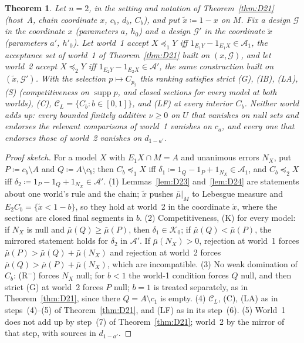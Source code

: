 \documentclass[11pt]{article}
\newtheorem{theorem}{Theorem}[section]
\theoremstyle{definition}
\theoremstyle{remark}
\newcommand{\C}{\mathcal C}
\newcommand{\supp}{\operatorname{supp}}
\begin{document}
\begin{theorem}\label{thm:H24}
Let $n=2$, in the setting and notation of Theorem~\ref{thm:D21} (host~A, chain coordinate $x$, $c_b$, $d_b$, $C_b$), and put $\tilde x\coloneqq1-x$ on $M$. Fix a design $\mathcal G$ in the coordinate $x$ (parameters $a$, $h_0$) and a design $\mathcal G'$ in the coordinate $\tilde x$ (parameters $a'$, $h'_0$). Let world~1 accept $X\preceq_1Y$ iff $1_{E_1Y}-1_{E_1X}\in\mathcal A_1$, the acceptance set of world~1 of Theorem~\ref{thm:D21} built on $(x,\mathcal G)$, and let world~2 accept $X\preceq_2Y$ iff $1_{E_2Y}-1_{E_2X}\in\mathcal A'$, the same construction built on $(\tilde x,\mathcal G')$. With the selection $p\mapsto C_{p_2}$ this ranking satisfies strict (G), (IB), (LA), (S) (competitiveness on $\supp p$, and closed sections for every model at both worlds), (C), $\C_L=\{C_b:b\in[0,1]\}$, and (LF) at every interior $C_b$. Neither world adds up: every bounded finitely additive $\nu\ge0$ on $U$ that vanishes on null sets and endorses the relevant comparisons of world~1 vanishes on $c_a$, and every one that endorses those of world~2 vanishes on $d_{1-a'}$.
\end{theorem}
\begin{proof}[Proof sketch]
For a model $X$ with $E_1X\cap M=A$ and unanimous errors $N_X$, put $P\coloneqq c_b\setminus A$ and $Q\coloneqq A\setminus c_b$; then $C_b\preceq_1X$ iff $\delta_1\coloneqq1_Q-1_P+1_{N_X}\in\mathcal A_1$, and $C_b\preceq_2X$ iff $\delta_2\coloneqq1_P-1_Q+1_{N_X}\in\mathcal A'$. (1) Lemmas~\ref{lem:D23} and~\ref{lem:D24} are statements about one world's rule and the chain; $\tilde x$ pushes $\bar\mu|_M$ to Lebesgue measure and $E_2C_b=\{\tilde x<1-b\}$, so they hold at world~2 in the coordinate $\tilde x$, where the sections are closed final segments in $b$. (2) Competitiveness, (K) for every model: if $N_X$ is null and $\bar\mu(Q)\ge\bar\mu(P)$, then $\delta_1\in\mathcal K_0$; if $\bar\mu(Q)<\bar\mu(P)$, the mirrored statement holds for $\delta_2$ in $\mathcal A'$. If $\bar\mu(N_X)>0$, rejection at world~1 forces $\bar\mu(P)>\bar\mu(Q)+\bar\mu(N_X)$ and rejection at world~2 forces $\bar\mu(Q)>\bar\mu(P)+\bar\mu(N_X)$, which are incompatible. (3) No weak domination of $C_b$: (R$^-$) forces $N_X$ null; for $b<1$ the world-1 condition forces $Q$ null, and then strict (G) at world~2 forces $P$ null; $b=1$ is treated separately, as in Theorem~\ref{thm:D21}, since there $Q=A\setminus c_1$ is empty. (4) $\C_L$, (C), (LA) as in steps~(4)--(5) of Theorem~\ref{thm:D21}, and (LF) as in its step~(6). (5) World~1 does not add up by step~(7) of Theorem~\ref{thm:D21}; world~2 by the mirror of that step, with sources in $d_{1-a'}$.
\end{proof}
\end{document}

